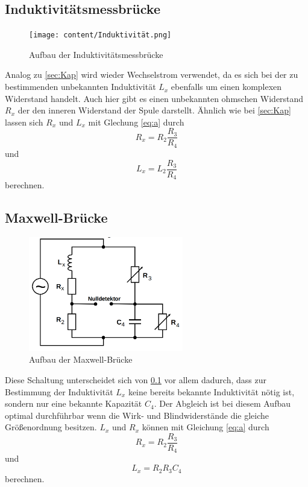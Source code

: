 \subsection{Induktivitätsmessbrücke}
\label{sec:Ind}
\begin{figure}[H]
\centering
    \texttt{[image: content/Induktivität.png]}
    \caption{Aufbau der Induktivitätsmessbrücke\cite[221]{sample}}
\end{figure}
Analog zu \ref{sec:Kap} wird wieder Wechselstrom
verwendet, da es sich bei der zu bestimmenden
unbekannten Induktivität $L_x$ ebenfalls um einen
komplexen Widerstand handelt. Auch hier gibt es einen
unbekannten ohmschen Widerstand $R_x$ der den
inneren Widerstand der Spule darstellt. Ähnlich wie
bei \ref{sec:Kap} lassen sich $R_x$ und $L_x$ mit
Glechung \ref{eq:a} durch
\begin{equation}
    R_x=R_2\frac{R_3}{R_4}
\end{equation}
\noindent und
\begin{equation}
    L_x=L_2\frac{R_3}{R_4}
\end{equation}
\noindent berechnen.



\subsection{Maxwell-Brücke}
\begin{figure}[H]
\centering
    \includegraphics[height= 5cm]{content/Maxwell.png}
    \caption{Aufbau der Maxwell-Brücke\cite[222]{sample}}
\end{figure}

\noindent Diese Schaltung unterscheidet sich von
\ref{sec:Ind} vor allem dadurch, dass zur Bestimmung
der Induktivität $L_x$ keine bereits bekannte
Induktivität nötig ist, sondern nur eine
bekannte Kapazität $C_4$. Der Abgleich ist bei
diesem Aufbau optimal durchführbar wenn
die Wirk- und Blindwiderstände die gleiche
Größenordnung besitzen. $L_x$ und $R_x$ können 
mit Gleichung \ref{eq:a} durch
\begin{equation}
    R_x=R_2\frac{R_3}{R_4}
\end{equation}
\noindent und
\begin{equation}
    L_x=R_2R_3C_4
\end{equation}
\noindent berechnen.



